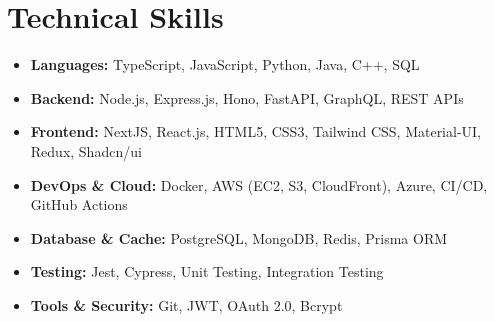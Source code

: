 \documentclass[letterpaper,11pt]{article}
\begin{document}
\section{Technical Skills}
\begin{itemize}[leftmargin=*,itemsep=2pt,parsep=0pt,topsep=0pt,partopsep=0pt]
	\item \textbf{Languages:} TypeScript, JavaScript, Python, Java, C++, SQL
	\item \textbf{Backend:} Node.js, Express.js, Hono, FastAPI, GraphQL, REST APIs
	\item \textbf{Frontend:} NextJS, React.js, HTML5, CSS3, Tailwind CSS, Material-UI, Redux, Shadcn/ui
	\item \textbf{DevOps \& Cloud:} Docker, AWS (EC2, S3, CloudFront), Azure, CI/CD, GitHub Actions
	\item \textbf{Database \& Cache:} PostgreSQL, MongoDB, Redis, Prisma ORM
	\item \textbf{Testing:} Jest, Cypress, Unit Testing, Integration Testing
	\item \textbf{Tools \& Security:} Git, JWT, OAuth 2.0, Bcrypt
\end{itemize}
\vspace{-7pt}

\end{document}
